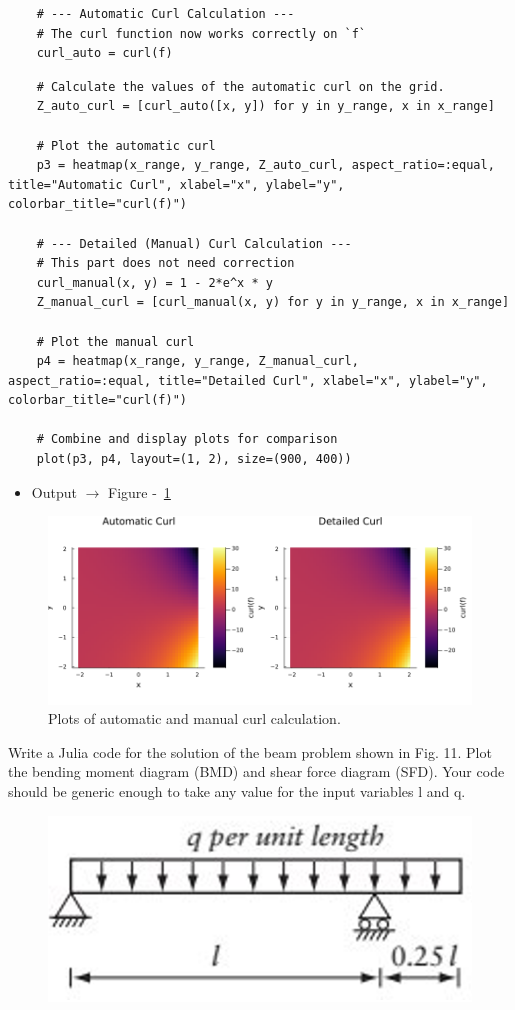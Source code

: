 \documentclass{homework}
\begin{document}
\begin{solution}
\begin{verbatim}
    # --- Automatic Curl Calculation ---
    # The curl function now works correctly on `f`
    curl_auto = curl(f)
    \end{verbatim}
    \begin{verbatim}
    # Calculate the values of the automatic curl on the grid.
    Z_auto_curl = [curl_auto([x, y]) for y in y_range, x in x_range]
    
    # Plot the automatic curl
    p3 = heatmap(x_range, y_range, Z_auto_curl, aspect_ratio=:equal, title="Automatic Curl", xlabel="x", ylabel="y", colorbar_title="curl(f)")
    
    # --- Detailed (Manual) Curl Calculation ---
    # This part does not need correction
    curl_manual(x, y) = 1 - 2*e^x * y
    Z_manual_curl = [curl_manual(x, y) for y in y_range, x in x_range]

    # Plot the manual curl
    p4 = heatmap(x_range, y_range, Z_manual_curl,  aspect_ratio=:equal, title="Detailed Curl", xlabel="x", ylabel="y", colorbar_title="curl(f)")

    # Combine and display plots for comparison
    plot(p3, p4, layout=(1, 2), size=(900, 400))
    \end{verbatim}
    
    \begin{itemize}
        \item Output $\rightarrow$ Figure -~\ref{fig:curlcalvsauto-2}
    \end{itemize}
    
    \begin{figure}[H]
        \centering
        \includegraphics[width=0.5\linewidth]{media/curlcalvsauto-2.png}
        \caption{Plots of  automatic and manual curl calculation.}
        \label{fig:curlcalvsauto-2}
    \end{figure}
\end{solution}

\question  Write a Julia code for the solution of the beam problem shown in Fig. 11. Plot the bending moment diagram (BMD) and shear force diagram (SFD). Your code should be generic enough to take any value for the input variables l and q.
\begin{figure}[H]
    \centering
    \includegraphics[width=0.4\linewidth]{media/figure-1.png}
    \caption{\empty}
    \label{fig:placeholder}
\end{figure}
\end{document}
